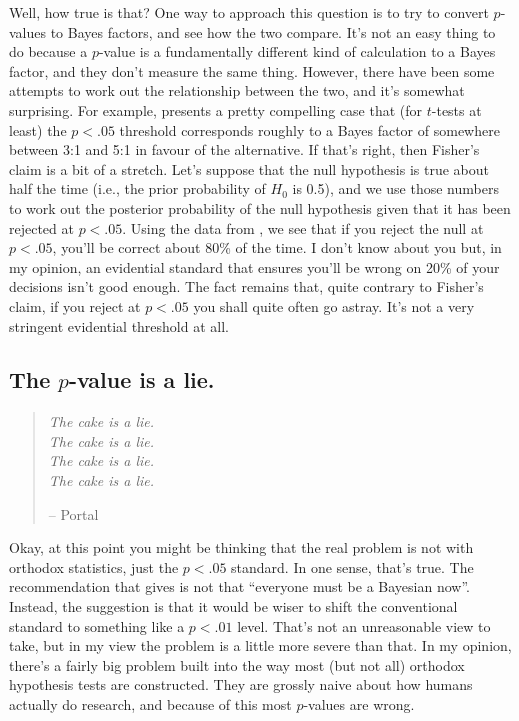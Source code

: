Well, how true is that? One way to approach this question is to try to convert $p$-values to Bayes factors, and see how the two compare. It's not an easy thing to do because a $p$-value is a fundamentally different kind of calculation to a Bayes factor, and they don't measure the same thing. However, there have been some attempts to work out the relationship between the two, and it's somewhat surprising. For example, \textcite{Johnson2013} presents a pretty compelling case that (for $t$-tests at least) the  $p<.05$ threshold corresponds roughly to a Bayes factor of somewhere between 3:1 and 5:1 in favour of the alternative. If that's right, then Fisher's claim is a bit of a stretch. Let's suppose that the null hypothesis is true about half the time (i.e., the prior probability of $H_0$ is 0.5), and we use those numbers to work out the posterior probability of the null hypothesis given that it has been rejected at $p<.05$. Using the data from \textcite{Johnson2013}, we see that if you reject the null at $p<.05$, you'll be correct about 80\% of the time. I don't know about you but, in my opinion, an evidential standard that ensures you'll be wrong on 20\% of your decisions isn't good enough. The fact remains that, quite contrary to Fisher's claim, if you reject at $p<.05$ you shall quite often go astray. It's not a very stringent evidential threshold at all. 

\subsection{The \texorpdfstring{$p$}{p}-value is a lie.}

\begin{quote}
{\it The cake is a lie.} \\ 
{\it The cake is a lie.} \\ 
{\it The cake is a lie.} \\ 
{\it The cake is a lie.} 
 
\hspace*{1cm} -- Portal
\end{quote}

Okay, at this point you might be thinking that the real problem is not with orthodox statistics, just the $p<.05$ standard. In one sense, that's true. The recommendation that \textcite{Johnson2013} gives is not that ``everyone must be a Bayesian now''. Instead, the suggestion is that it would be wiser to shift the conventional standard to something like a $p<.01$ level. That's not an unreasonable view to take, but in my view the problem is a little more severe than that. In my opinion, there's a fairly big problem built into the way most (but not all) orthodox hypothesis tests are constructed. They are grossly naive about how humans actually do research, and because of this most $p$-values are wrong. 

